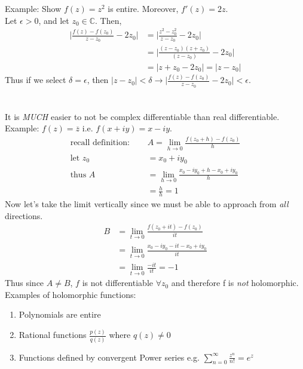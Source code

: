 \documentclass[a4paper, 11pt]{article}
\begin{document}
\noindent Example: Show $f(z) = z^2$ is entire. Moreover,  $f'(z) = 2z$. \\
Let $\epsilon > 0$, and let $z_0 \in \mathbb{C}$. Then, 
	\begin{align*}
		\Big|\frac{f(z)-f(z_0)}{z-z_0}-2z_0\Big| &= \Big|\frac{z^2-z_0^2}{z-z_0}-2z_0\Big| \\ 
			&= \Big| \frac{(z-z_0)(z+z_0)}{(z-z_0)} - 2z_0\Big| \\ 
			&= |z+z_0-2z_0| = |z-z_0|
	\end{align*}
Thus if we select $\delta = \epsilon$, then $|z-z_0| < \delta \rightarrow \Big|\frac{f(z)-f(z_0)}{z-z_0}-2z_0\Big|<\epsilon$. \\ \\ \\

\noindent It is \textit{MUCH} easier to not be complex differentiable than real differentiable. Example: $f(z) = \overline{z}$ i.e. $f(x+iy) = x-iy$. 
	\begin{align*}
		\text{recall definition: } \quad& A = \lim_{h\rightarrow 0}\frac{f(z_0+h)-f(z_0)}{h} \\ 
		\text{let } z_0 &= x_0 + iy_0 \\ 
		\text{thus } A &= \lim_{h\rightarrow 0}\frac{x_0-iy_0+h-x_0+iy_0}{h} \\ 
			&= \frac{h}{h} = 1
	\end{align*}
Now let's take the limit vertically since we must be able to approach from \textit{all} directions.
	\begin{align*}
		B &= \lim_{t\rightarrow 0}\frac{f(z_0+it)-f(z_0)}{it} \\ 
			&= \lim_{t\rightarrow 0}\frac{x_0-iy_0-it-x_0+iy_0}{it} \\
			&= \lim_{t\rightarrow 0}\frac{-it}{it} = -1
	\end{align*}
Thus since $A\neq B$, $f$ is not differentiable $\forall z_0$ and therefore f is \textit{not} holomorphic. \\

\noindent Examples of holomorphic functions:
	\begin{enumerate}
		\item Polynomials are entire
		\item Rational functions $\frac{p(z)}{q(z)}$ where $q(z)\neq 0$
		\item Functions defined by convergent Power series e.g. $\sum_{n=0}^\infty \frac{z^n}{n!} = e^z$
	\end{enumerate}
\end{document}
